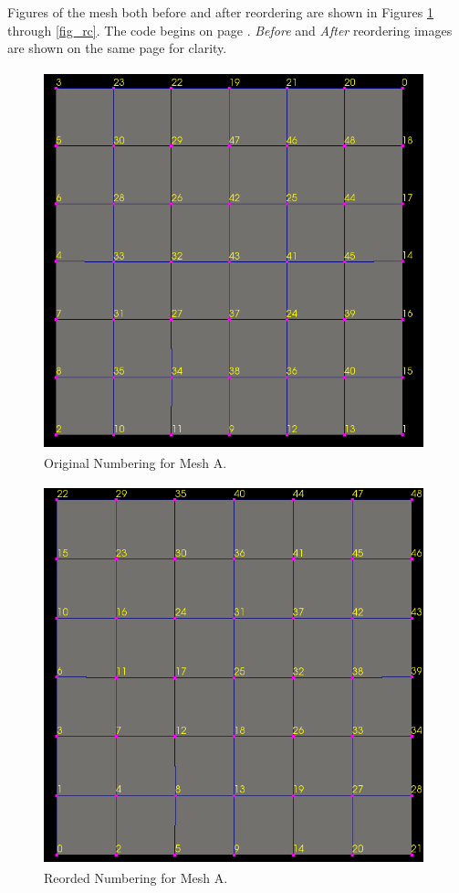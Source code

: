 \documentclass[a4paper, 12pt]{article}
\begin{document}
Figures of the mesh both before and after reordering are shown
in Figures \ref{fig_oa} through \ref{fig_rc}. The code 
begins on page \pageref{sec:code}.
\emph{Before} and \emph{After} reordering images are shown on the
same page for clarity. 

\newpage 

\begin{figure}[H]
  \centering
  \includegraphics[width=11cm, height=11cm]{orig_a} 
  \caption{Original Numbering for Mesh A. }
  \label{fig_oa}
\end{figure}

\begin{figure}[H]
  \centering
  \includegraphics[width=11cm, height=11cm]{reorder_a} 
  \caption{Reorded Numbering for Mesh A. }
  \label{fig_ra}
\end{figure}
\end{document}
